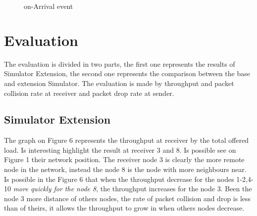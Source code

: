 \documentclass[conference]{IEEEtran}
\begin{document}
\begin{figure}[H]
	\centering	 
	\caption{on-Arrival event}%
\end{figure}


\section{Evaluation}

The evaluation is divided in two parts, the first one represents the results of Simulator Extension, the second one represents the comparison between the base and extension Simulator. The evaluation is made by throughput and packet collision rate at receiver and packet drop rate at sender. 

\subsection{Simulator Extension}

The graph on Figure 6 represents the throughput at receiver by the total offered load. Is interesting highlight the result at receiver 3 and 8. Is possible see on Figure 1 their network position. The receiver node 3 is clearly the more remote node in the network, instead the node 8 is the node with more neighbours near. Is possible in the Figure 6 that when the throughput decrease for the nodes 1-2,4-10 \textit{more quickly for the node 8}, the throughput increases for the node 3. Been the node 3 more distance of others nodes, the rate of packet collision and drop is less than of theirs, it allows the throughput to grow in when others nodes decrease.
\end{document}
